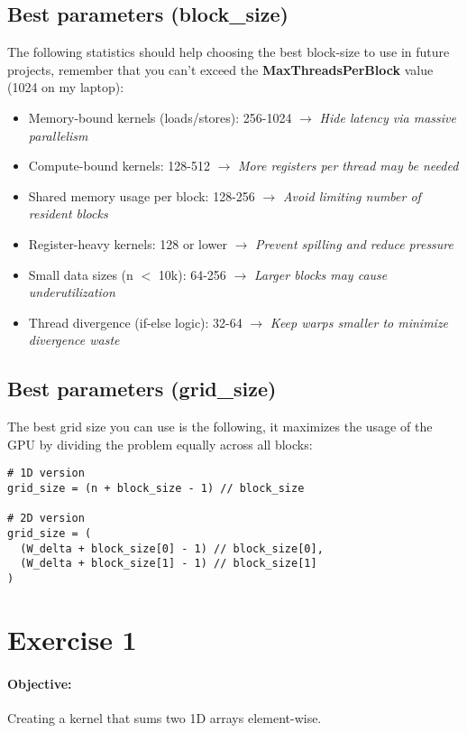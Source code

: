 \documentclass{article}
\begin{document}
\newpage

\subsection{Best parameters (block\_size)} The following statistics should help choosing the best block-size to use in future projects, remember that you can't exceed the \textbf{MaxThreadsPerBlock} value (1024 on my laptop):
\begin{itemize}
    \item Memory-bound kernels (loads/stores): 256-1024 $\longrightarrow$ \textit{Hide latency via massive parallelism}
    \item Compute-bound kernels: 128-512 $\longrightarrow$ \textit{More registers per thread may be needed}
    \item Shared memory usage per block: 128-256 $\longrightarrow$ \textit{Avoid limiting number of resident blocks}
    \item Register-heavy kernels: 128 or lower $\longrightarrow$ \textit{Prevent spilling and reduce pressure}
    \item Small data sizes (n $<$ 10k): 64-256 $\longrightarrow$ \textit{Larger blocks may cause underutilization}
    \item Thread divergence (if-else logic): 32-64 $\longrightarrow$ \textit{Keep warps smaller to minimize divergence waste}
\end{itemize}


\subsection{Best parameters (grid\_size)} The best grid size you can use is the following, it maximizes the usage of the GPU by dividing the problem equally across all blocks:
\begin{lstlisting}[caption=Determine grid size]
# 1D version
grid_size = (n + block_size - 1) // block_size 

# 2D version
grid_size = (
  (W_delta + block_size[0] - 1) // block_size[0],
  (W_delta + block_size[1] - 1) // block_size[1]
) 
\end{lstlisting}

\newpage

\section{Exercise 1}
\paragraph{Objective:}
Creating a kernel that sums two 1D arrays element-wise.
\end{document}
